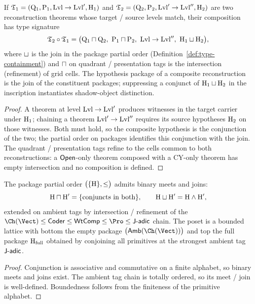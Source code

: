 \begin{proposition}
\label{prop:type-composition}
\ClaimStatusProvedHere
If $\mathfrak{T}_1=(\mathrm{Q}_1,\mathrm{P}_1,\mathrm{Lvl}\to\mathrm{Lvl}',\mathrm{H}_1)$
and $\mathfrak{T}_2=(\mathrm{Q}_2,\mathrm{P}_2,\mathrm{Lvl}'\to\mathrm{Lvl}'',\mathrm{H}_2)$
are two reconstruction theorems whose target / source levels match,
their composition has type signature
\[
 \TypeSig_2\circ\TypeSig_1
 =\bigl(\Quad_1\meet\Quad_2,\ \Pres_1\meet\Pres_2,\ \BeilLevel\to\BeilLevel'',\ \Hyp_1\joinp\Hyp_2\bigr),
\]
where $\sqcup$ is the join in the package partial order
(Definition~\ref{def:type-containment}) and $\sqcap$ on quadrant /
presentation tags is the intersection (refinement) of grid cells.
The hypothesis package of a composite reconstruction is the join of
the constituent packages; suppressing a conjunct of $\mathrm{H}_1\sqcup\mathrm{H}_2$
in the inscription instantiates shadow-object distinction.
\end{proposition}

\begin{proof}
A theorem at level $\mathrm{Lvl}\to\mathrm{Lvl}'$ produces witnesses in the
target carrier under $\mathrm{H}_1$; chaining a theorem
$\mathrm{Lvl}'\to\mathrm{Lvl}''$ requires its source hypotheses $\mathrm{H}_2$ on
those witnesses. Both must hold, so the composite hypothesis is the
conjunction of the two; the partial order on packages identifies this
conjunction with the join. The quadrant / presentation tags refine to
the cells common to both reconstructions: a $\mathsf{Open}$-only theorem
composed with a $\mathrm{CY}$-only theorem has empty intersection and
no composition is defined.
\end{proof}

\begin{proposition}
\label{prop:type-meetjoin}
\ClaimStatusProvedHere
The package partial order
$\bigl(\{\mathrm{H}\},\leq\bigr)$ admits binary meets and joins:
\[
 \mathrm{H}\sqcap\mathrm{H}'
 =\{\text{conjuncts in both}\},\qquad
 \mathrm{H}\sqcup\mathrm{H}'
 =\mathrm{H}\wedge\mathrm{H}',
\]
extended on ambient tags by intersection / refinement of the
$\Ch(\Vect)\leq\HypCoder\leq\HypWtComp\leq\Pro\leq\HypJad$ chain. The
poset is a bounded lattice with bottom the empty package
$\bigl(\HypAmb(\Ch(\Vect))\bigr)$ and top the full package
$\mathrm{H}_{\mathrm{full}}$ obtained by conjoining all primitives at the
strongest ambient tag $\mathsf{J\text{-}adic}$.
\end{proposition}

\begin{proof}
Conjunction is associative and commutative on a finite alphabet, so
binary meets and joins exist. The ambient tag chain is totally
ordered, so its meet / join is well-defined. Boundedness follows from
the finiteness of the primitive alphabet.
\end{proof}

